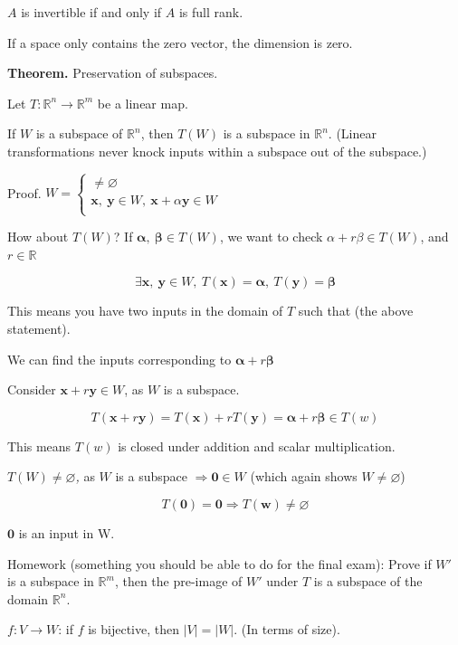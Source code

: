 \documentclass[
]{article}
\begin{document}
$A$ is invertible if and only if $A$ is full rank.

If a space only contains the zero vector, the dimension is zero.

\textbf{Theorem.} Preservation of subspaces.

Let $T:\mathbb{R}^{n} \rightarrow \mathbb{R}^{m}$ be a linear map.

If $W$ is a subspace of $\mathbb{R}^{n}$, then $T(W)$ is a
subspace in $\mathbb{R}^{n}$. (Linear transformations never knock
inputs within a subspace out of the subspace.)

Proof. $W = \left\{ \begin{matrix}
 \neq \varnothing \\
\mathbf{x},\ \mathbf{y} \in W,\ \mathbf{x} + \alpha\mathbf{y} \in W \\
\end{matrix} \right.\ $

How about $T(W)$? If
$\mathbf{\alpha},\ \mathbf{\beta} \in T(W)$, we want to check
$\alpha + r\beta \in T(W)$, and $r\mathbb{\in R}$

$$\exists\mathbf{x},\ \mathbf{y} \in W,\ T\left( \mathbf{x} \right) = \mathbf{\alpha},\ T\left( \mathbf{y} \right) = \mathbf{\beta}$$

This means you have two inputs in the domain of $T$ such that (the
above statement).

We can find the inputs corresponding to
$\mathbf{\alpha} + r\mathbf{\beta}$

Consider $\mathbf{x} + r\mathbf{y} \in W$, as $W$ is a
subspace.

$$T\left( \mathbf{x} + r\mathbf{y} \right) = T\left( \mathbf{x} \right) + rT\left( \mathbf{y} \right) = \mathbf{\alpha} + r\mathbf{\beta} \in T(w)$$

This means $T(w)$ is closed under addition and scalar multiplication.

$T(W) \neq \varnothing$\emph{,} as $W$ is a subspace
$\Rightarrow \mathbf{0} \in W$ (which again shows
$W \neq \varnothing$)

$$T\left( \mathbf{0} \right) = \mathbf{0} \Rightarrow T(\mathbf{w}) \neq \varnothing$$

$\mathbf{0}$ is an input in W.

Homework (something you should be able to do for the final exam): Prove
if $W'$ is a subspace in $\mathbb{R}^{m}$, then the pre-image of
$W'$ under $T$ is a subspace of the domain $\mathbb{R}^{n}$.

$f:V \rightarrow W$: if $f$ is bijective, then $|V| = |W|$. (In
terms of size).
\end{document}

